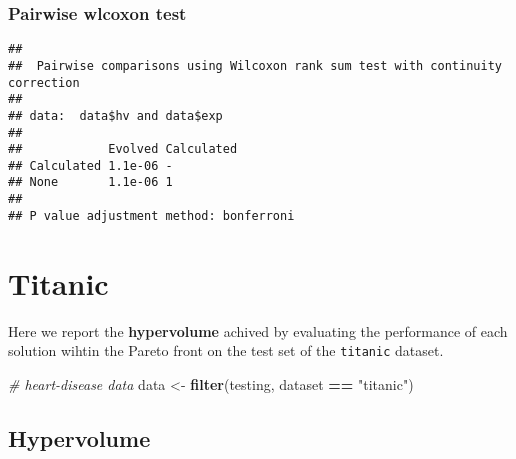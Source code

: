 \documentclass[
]{book}
\newenvironment{Shaded}{\begin{snugshade}}{\end{snugshade}}
\newcommand{\AttributeTok}[1]{\textcolor[rgb]{0.13,0.29,0.53}{#1}}
\newcommand{\CommentTok}[1]{\textcolor[rgb]{0.56,0.35,0.01}{\textit{#1}}}
\newcommand{\ConstantTok}[1]{\textcolor[rgb]{0.56,0.35,0.01}{#1}}
\newcommand{\FunctionTok}[1]{\textcolor[rgb]{0.13,0.29,0.53}{\textbf{#1}}}
\newcommand{\NormalTok}[1]{#1}
\newcommand{\OtherTok}[1]{\textcolor[rgb]{0.56,0.35,0.01}{#1}}
\newcommand{\SpecialCharTok}[1]{\textcolor[rgb]{0.81,0.36,0.00}{\textbf{#1}}}
\newcommand{\StringTok}[1]{\textcolor[rgb]{0.31,0.60,0.02}{#1}}
\begin{document}
\hypertarget{pairwise-wlcoxon-test-3}{%
\subsection{Pairwise wlcoxon test}\label{pairwise-wlcoxon-test-3}}

\begin{Shaded}
\end{Shaded}

\begin{verbatim}
## 
##  Pairwise comparisons using Wilcoxon rank sum test with continuity correction 
## 
## data:  data$hv and data$exp 
## 
##            Evolved Calculated
## Calculated 1.1e-06 -         
## None       1.1e-06 1         
## 
## P value adjustment method: bonferroni
\end{verbatim}

\hypertarget{titanic}{%
\chapter{Titanic}\label{titanic}}

Here we report the \textbf{hypervolume} achived by evaluating the performance of each solution wihtin the Pareto front on the test set of the \texttt{titanic} dataset.

\begin{Shaded}
\begin{Highlighting}[]
\CommentTok{\# heart{-}disease data}
\NormalTok{data }\OtherTok{\textless{}{-}} \FunctionTok{filter}\NormalTok{(testing, dataset }\SpecialCharTok{==} \StringTok{"titanic"}\NormalTok{)}
\end{Highlighting}
\end{Shaded}

\hypertarget{hypervolume-4}{%
\section{Hypervolume}\label{hypervolume-4}}
\end{document}
